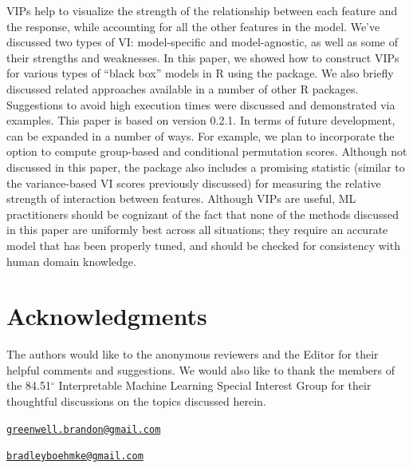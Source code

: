 VIPs help to visualize the strength of the relationship between each
feature and the response, while accounting for all the other features in
the model. We've discussed two types of VI: model-specific and
model-agnostic, as well as some of their strengths and weaknesses. In
this paper, we showed how to construct VIPs for various types of ``black
box'' models in R using the  package. We also briefly discussed
related approaches available in a number of other R packages.
Suggestions to avoid high execution times were discussed and
demonstrated via examples. This paper is based on  version
0.2.1. In terms of future development,  can be expanded in a
number of ways. For example, we plan to incorporate the option to
compute group-based and conditional permutation scores. Although not
discussed in this paper, the package also includes a promising statistic
(similar to the variance-based VI scores previously discussed) for
measuring the relative strength of interaction between features.
Although VIPs are useful, ML practitioners should be cognizant of the
fact that none of the methods discussed in this paper are uniformly best
across all situations; they require an accurate model that has been
properly tuned, and should be checked for consistency with human domain
knowledge.

\section{Acknowledgments}

The authors would like to the anonymous reviewers and the Editor for
their helpful comments and suggestions. We would also like to thank the
members of the 84.51\(^{\circ}\) Interpretable Machine Learning Special
Interest Group for their thoughtful discussions on the topics discussed
herein.




\address{%
Brandon M. Greenwell\\
University of Cincinnati\\
2925 Campus Green Dr\\ Cincinnati, OH 45221\\ United States of America\\ ORCiD---\href{https://orcid.org/0000-0002-8120-0084}{0000-0002-8120-0084}\\
}
\href{mailto:greenwell.brandon@gmail.com}{\nolinkurl{greenwell.brandon@gmail.com}}

\address{%
Bradley C. Boehmke\\
University of Cincinnati\\
2925 Campus Green Dr\\ Cincinnati, OH 45221\\ United States of America\\ ORCiD---\href{https://orcid.org/0000-0002-3611-8516}{0000-0002-3611-8516}\\
}
\href{mailto:bradleyboehmke@gmail.com}{\nolinkurl{bradleyboehmke@gmail.com}}

